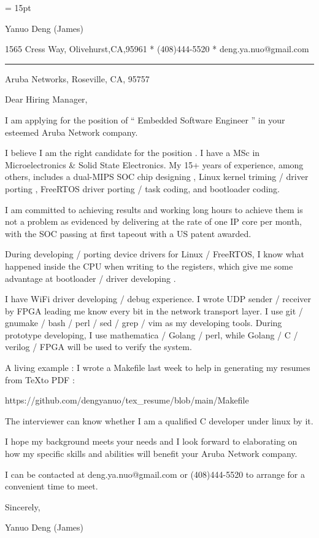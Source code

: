 

  \FFrg \baselineskip = 15pt

{
Yanuo Deng (James)
}

{ 
1565 Cress Way, Olivehurst,CA,95961
*
(408)444-5520
*
deng.ya.nuo@gmail.com
}

{ \smallbreak } 

{\par\noindent\hrule} 

{ \bigbreak } 


Aruba Networks, Roseville, CA, 95757

{ 
Dear Hiring Manager,
}

{ \bigbreak } 
I am applying for the position of `` Embedded Software Engineer '' in your esteemed Aruba Network company.

{ \bigbreak } 
I believe I am the right candidate for the position .
I have a MSc in Microelectronics \& Solid State Electronics.
My 15+ years of experience, among others, 
includes a dual-MIPS SOC chip designing ,
Linux kernel triming  /  driver porting , 
FreeRTOS driver porting  /  task coding,
and bootloader coding.

{ \bigbreak } 
I am committed to achieving results and working long hours 
to achieve them is not a problem as evidenced by 
delivering at the rate of one IP core per month,
with the SOC passing at first tapeout
with a US patent awarded.

{ \bigbreak } 
During developing  /  porting device drivers for Linux / FreeRTOS,
I know what happened inside the CPU when writing to the registers,
which give me some advantage at bootloader  /  driver developing .

{ \bigbreak } 
I have WiFi driver developing / debug experience. 
I wrote UDP sender / receiver by FPGA leading me know every bit in the network transport layer.
I use git  /  gnumake  /  bash  /  perl  /  sed  /  grep  /  vim as my developing tools.
During prototype developing, I use mathematica / Golang / perl, 
while Golang / C / verilog / FPGA will be used to verify the system.

{ \bigbreak } 
A living example : I wrote a Makefile last week to help in generating my resumes from \TeX to PDF : 

\centerline{
https://github.com/dengyanuo/tex\_resume/blob/main/Makefile
}

The interviewer can know whether I am a qualified C developer under linux by it.

{ \bigbreak } 
I hope my background meets your needs and I look
forward to elaborating on how my specific skills and abilities will benefit your Aruba Network company.

{ \bigbreak } 
I can be contacted at deng.ya.nuo@gmail.com
or (408)444-5520 to arrange for a convenient time to meet.

{ \bigbreak } 




\vskip 60pt

{ \bigbreak } 
Sincerely,

Yanuo Deng (James)

\bye
